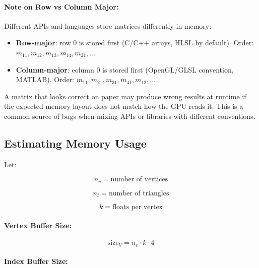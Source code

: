 \documentclass[11pt]{article}
\begin{document}
\begin{equation}
    [m_{11}, m_{12}, \dots, m_{44}]
\end{equation}

\paragraph{Note on Row vs Column Major:}

Different APIs and languages store matrices differently in memory:
\begin{itemize}
    \item \textbf{Row-major}: row 0 is stored first (C/C++ arrays, HLSL by default). Order: $m_{11}, m_{12}, m_{13}, m_{14}, m_{21}, \dots$
    \item \textbf{Column-major}: column 0 is stored first (OpenGL/GLSL convention, MATLAB). Order: $m_{11}, m_{21}, m_{31}, m_{41}, m_{12}, \dots$
\end{itemize}

A matrix that looks correct on paper may produce wrong results at runtime if the expected memory layout does not match how the GPU reads it. This is a common source of bugs when mixing APIs or libraries with different conventions.


\subsection{Estimating Memory Usage}

Let:

\begin{equation}
    n_v = \text{number of vertices}
\end{equation}

\begin{equation}
    n_t = \text{number of triangles}
\end{equation}

\begin{equation}
    k = \text{floats per vertex}
\end{equation}

\paragraph{Vertex Buffer Size:}

\begin{equation}
    \text{size}_V = n_v \cdot k \cdot 4
\end{equation}

\paragraph{Index Buffer Size:}
\end{document}
